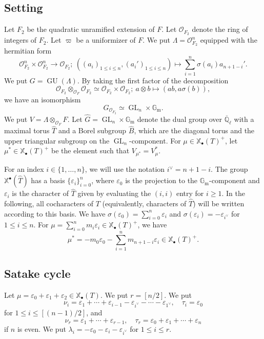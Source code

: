 \documentclass[12pt,a4paper]{article}
\DeclareMathOperator{\GL}{GL}
\DeclareMathOperator{\GU}{GU}
\newcommand{\bQ}{\mathbb{Q}}
\newcommand{\bX}{\mathbb{X}}
\newcommand{\cO}{\mathcal{O}}
\newcommand{\ol}{\overline}
\newcommand{\Gm}{\mathbb{G}_{\mathrm{m}}}
\begin{document}
\subsection{Setting}
Let $F_2$ be the quadratic unramified extension of $F$. Let $\cO_{F_2}$ denote the ring of integers of $F_2$. 
Let $\varpi$ be a uniformizer of $F$. 
We put $\Lambda=\cO_{F_2}^n$ equipped with the hermitian form 
\begin{equation}\label{eq:HermOpair}
 \cO_{F_2}^n \times \cO_{F_2}^n \to \cO_{F_2};\ 
 ((a_i)_{1 \leq i \leq n},(a_i')_{1 \leq i \leq n}) 
 \mapsto \sum_{i=1}^n \sigma (a_i) a_{n+1-i}' . 
\end{equation}
We put $G=\GU (\Lambda)$. 
By taking the first factor of the decomposition 
\[
 \cO_{F_2} \otimes_{\cO_F} \cO_{F_2} \simeq \cO_{F_2} \times \cO_{F_2};\ 
 a \otimes b \mapsto (ab,a\sigma(b)) , 
\]
we have an isomorphism 
\begin{equation}\label{eq:punisp}
 G_{\cO_{F_2}} \simeq \GL_n \times \Gm . 
\end{equation}
We put $V=\Lambda \otimes_{\cO_F} F$. 
Let $\widehat{G} = \GL_n \times \Gm$ denote the dual group over $\ol{\bQ}_{\ell}$ 
with a maximal torus $\widehat{T}$ and a Borel subgroup $\widehat{B}$, 
which are the diagonal torus and the upper triangular subgroup on the $\GL_n$-component. 
For $\mu \in \bX_{\bullet}(T)^+$, let 
$\mu^* \in \bX_{\bullet}(T)^+$ be the element such that 
$V_{\mu^*}=V_{\mu}^*$. 

For an index $i \in \{1, \dots, n \}$, we will use the notation $i^\vee = n + 1 - i$. The group $\mathbb{X}^{\bullet}( \widehat{T})$ has a basis $\{ \varepsilon_i \}_{i=0}^n$, where 
$\varepsilon_0$ is the projection to the $\Gm$-component and 
$\varepsilon_i$ is the character of $\widehat{T}$ given by evaluating the $(i,i)$ entry for $i \geq 1$. In the following, all cocharacters of $T$ (equivalently, characters of $\widehat{T}$) will be written according to this basis. 
We have 
$\sigma (\varepsilon_0)=\sum_{i=0}^n \varepsilon_i$ and 
$\sigma (\varepsilon_i)=-\varepsilon_{i^{\vee}}$ for $1 \leq i \leq n$. 
For $\mu =\sum_{i=0}^n m_i \varepsilon_i \in \bX_{\bullet}(T)^+$, we have \[
 \mu^* = -m_0 \varepsilon_0 - \sum_{i=1}^n m_{n+1-i} \varepsilon_i \in \bX_{\bullet}(T)^+. 
\]
\subsection{Satake cycle}
Let $\mu =\varepsilon_0 + \varepsilon_1 +\varepsilon_2 \in \bX_{\bullet}(T)$. 
We put $r=[n/2]$. 
We put 
\[
 \nu_i=\varepsilon_1 + \cdots + \varepsilon_{i-1} 
 -\varepsilon_{i^{\vee}} - \cdots - \varepsilon_{1^{\vee}}, \quad 
 \tau_i=\varepsilon_0 
\]
for $1 \leq i \leq [(n-1)/2]$, and 
\[
 \nu_r=\varepsilon_1 + \cdots + \varepsilon_{r-1} , 
 \quad 
 \tau_r=\varepsilon_0 +\varepsilon_1 + \cdots + \varepsilon_n 
\]
if $n$ is even. 
We put $\lambda_i=-\varepsilon_0 -\varepsilon_i -\varepsilon_{i^{\vee}}$ for $1 \leq i \leq r$. 
\end{document}
